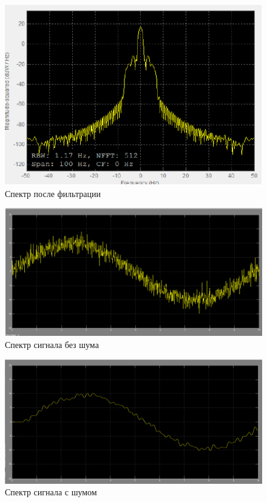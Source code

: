 \begin{figure}[H]
   \includegraphics[scale=0.7]{lab6/7.png}
   \caption{Спектр после фильтрации}
\end{figure}
\begin{figure}[H]
   \includegraphics[scale=0.7]{lab6/8.png}
   \caption{Спектр сигнала без шума}
\end{figure}

\begin{figure}[H]
   \includegraphics[scale=0.7]{lab6/9.png}
   \caption{Спектр сигнала с шумом}
\end{figure}

